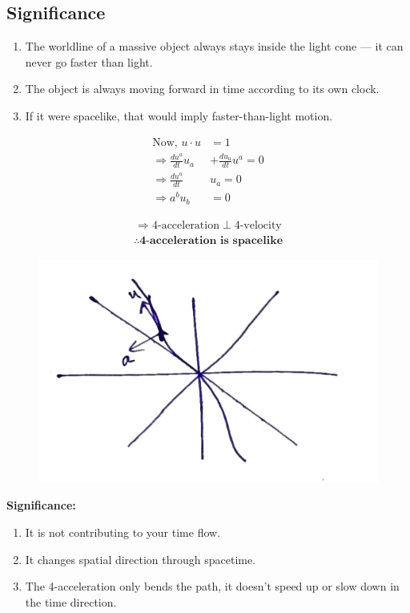 \documentclass[14pt]{article} %
\begin{document}
\subsection*{Significance}
\begin{enumerate}
    \item The worldline of a massive object always stays inside the light cone --- it can never go faster than light.
    \item The object is always moving forward in time according to its own clock.
    \item If it were spacelike, that would imply faster-than-light motion.
\end{enumerate}
\begin{align*}
    \text{Now, }u \cdot u &= 1 \\
    \Rightarrow \frac{du^a}{dt} u_a &+ \frac{du_a}{dt} u^a = 0 \\
    \Rightarrow \frac{du^a}{dt} &u_a = 0 \\
    \Rightarrow a^b u_b &= 0
\end{align*}
\begin{figure}[H]
\centering
\begin{minipage}[c]{0.45\textwidth}
\begin{align*}
\Rightarrow \text{4-acceleration} \perp \text{4-velocity}
\end{align*}
\begin{align*}
\therefore \textbf{4-acceleration is spacelike}
\end{align*}
\end{minipage}
\hfill
\begin{minipage}[c]{0.5\textwidth}
\centering
\includegraphics[width=\linewidth]{L(-1)_6.jpg}
\end{minipage}
\end{figure}
\newpage
\textbf{Significance:}
\begin{enumerate}
    \item It is not contributing to your time flow.
    \item It changes spatial direction through spacetime.
    \item The 4-acceleration only bends the path, it doesn't speed up or slow down in the time direction.
\end{enumerate}
\end{document}
